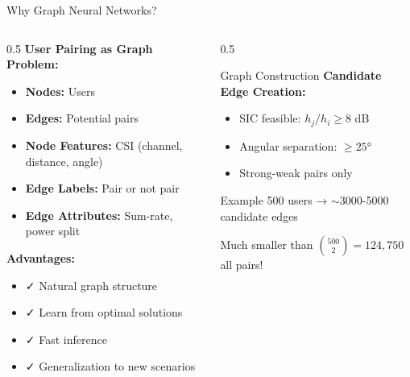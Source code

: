 \documentclass[aspectratio=169]{beamer}
\begin{document}
\begin{frame}{Why Graph Neural Networks?}
    \begin{columns}
        \begin{column}{0.5\textwidth}
            \textbf{User Pairing as Graph Problem:}
            \begin{itemize}
                \item \textbf{Nodes:} Users
                \item \textbf{Edges:} Potential pairs
                \item \textbf{Node Features:} CSI (channel, distance, angle)
                \item \textbf{Edge Labels:} Pair or not pair
                \item \textbf{Edge Attributes:} Sum-rate, power split
            \end{itemize}
            
            \vspace{0.3cm}
            
            \textbf{Advantages:}
            \begin{itemize}
                \item ✓ Natural graph structure
                \item ✓ Learn from optimal solutions
                \item ✓ Fast inference
                \item ✓ Generalization to new scenarios
            \end{itemize}
        \end{column}
        \begin{column}{0.5\textwidth}
            \begin{block}{Graph Construction}
                \textbf{Candidate Edge Creation:}
                \begin{itemize}
                    \item SIC feasible: $h_j/h_i \geq 8$ dB
                    \item Angular separation: $\geq 25°$
                    \item Strong-weak pairs only
                \end{itemize}
            \end{block}
            
            \vspace{0.2cm}
            
            \begin{exampleblock}{Example}
                500 users → $\sim$3000-5000 candidate edges
                
                \vspace{0.1cm}
                
                Much smaller than $\binom{500}{2} = 124,750$ all pairs!
            \end{exampleblock}
        \end{column}
    \end{columns}
\end{frame}
\end{document}

